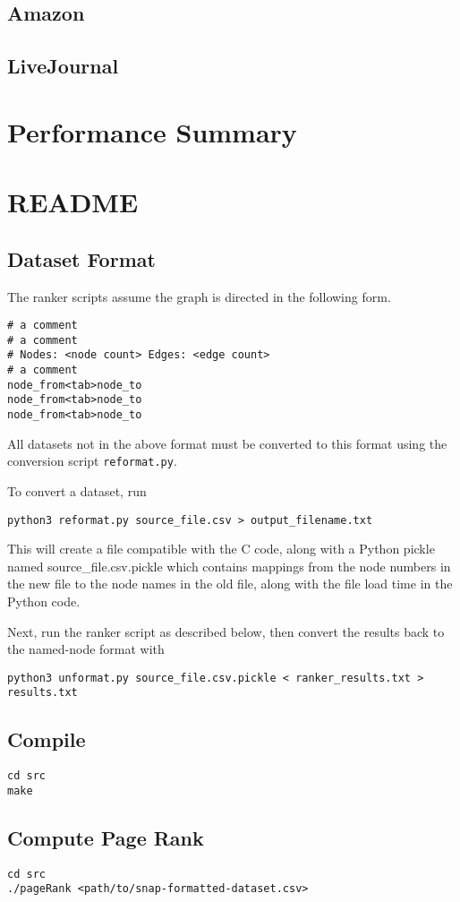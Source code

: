 \documentclass[draft]{report}
\begin{document}
\subsection{Amazon}
\subsection{LiveJournal}

\section{Performance Summary}

\appendix

\section{README}

\subsection{Dataset Format}
The ranker scripts assume the graph is directed in the following form.

\begin{lstlisting}
# a comment
# a comment
# Nodes: <node count> Edges: <edge count>
# a comment
node_from<tab>node_to
node_from<tab>node_to
node_from<tab>node_to
\end{lstlisting}

All datasets not in the above format must be converted to this format using the conversion script \texttt{reformat.py}.

To convert a dataset, run
\begin{lstlisting}
python3 reformat.py source_file.csv > output_filename.txt
\end{lstlisting}

This will create a file compatible with the C code, along with a Python pickle named source_file.csv.pickle which contains mappings from the node numbers in the new file to the node names in the old file, along with the file load time in the Python code.

Next, run the ranker script as described below, then convert the
results back to the named-node format with
\begin{lstlisting}
python3 unformat.py source_file.csv.pickle < ranker_results.txt > results.txt
\end{lstlisting}

\subsection{Compile}
\begin{lstlisting}
cd src
make
\end{lstlisting}

\subsection{Compute Page Rank}
\begin{lstlisting}
cd src
./pageRank <path/to/snap-formatted-dataset.csv>
\end{lstlisting}
\end{document}
